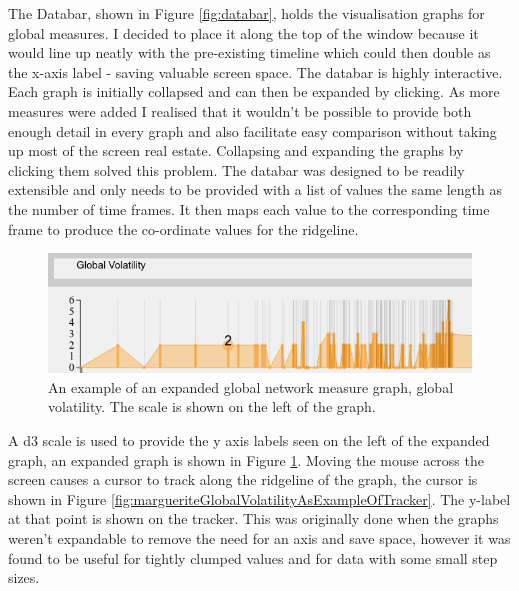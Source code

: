 The Databar, shown in Figure \ref{fig:databar}, holds the visualisation graphs for global measures. I decided to place it along the top of the window because it would line up neatly with the pre-existing timeline which could then double as the x-axis label - saving valuable screen space.
The databar is highly interactive. Each graph is initially collapsed and can then be expanded by clicking. As more measures were added I realised that it wouldn't be possible to provide both enough detail in every graph and also facilitate easy comparison without taking up most of the screen real estate. Collapsing and expanding the graphs by clicking them solved this problem. The databar was designed to be readily extensible and only needs to be provided with a list of values the same length as the number of time frames. It then maps each value to the corresponding time frame to produce the co-ordinate values for the ridgeline. 

\begin{figure}[H]
  \begin{center}
  \includegraphics[trim={0 0 0 0}, width=140mm]{./Figures/margueriteGlobalVolatility.png}
  \caption{An example of an expanded global network measure graph, global volatility. The scale is shown on the left of the graph.}
  \label{fig:margueriteGlobalVolatilityAsExample}
  \end{center}
\end{figure}

A d3 scale is used to provide the y axis labels seen on the left of the expanded graph, an expanded graph is shown in Figure \ref{fig:margueriteGlobalVolatilityAsExample}. Moving the mouse across the screen causes a cursor to track along the ridgeline of the graph, the cursor is shown in Figure \ref{fig:margueriteGlobalVolatilityAsExampleOfTracker}. The y-label at that point is shown on the tracker. This was originally done when the graphs weren't expandable to remove the need for an axis and save space, however it was found to be useful for tightly clumped values and for data with some small step sizes.

